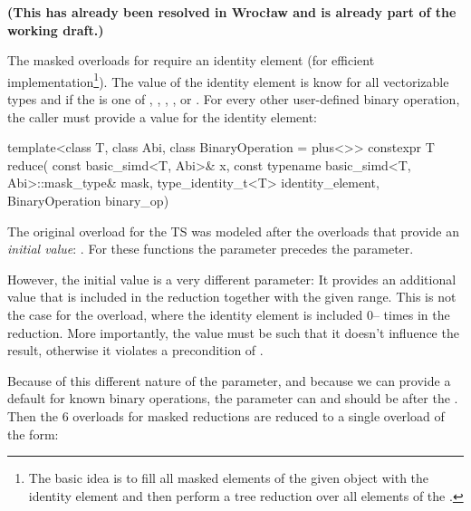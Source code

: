 \textbf{(This has already been resolved in Wrocław and is already part of the working draft.)}

The masked \std{} overloads for  require an identity element (for efficient
implementation\footnote{The basic idea is to fill all masked elements of the given 
object with the identity element and then perform a tree reduction over all elements of the
.}).
The value of the identity element is know for all vectorizable types and if the
 is one of \std{}, \std{}, \std{},
\std{}, or \std{}.
For every other user-defined binary operation, the caller must provide a value for the identity
element:

\begin{wgText}[P1928R11]
  \setcounter{Paras}{0}
  \begin{codeblock}
  template<class T, class Abi, class BinaryOperation = plus<>>
    constexpr T reduce(
      const basic_simd<T, Abi>& x, const typename basic_simd<T, Abi>::mask_type& mask,
      type_identity_t<T> identity_element, BinaryOperation binary_op)
  \end{codeblock}
\end{wgText}

The original  overload for the TS was modeled after the overloads that provide an
\emph{initial value}: .
For these functions the  parameter precedes the  parameter.

However, the initial value is a very different parameter: It provides an additional value that is
included in the reduction together with the given range.
This is not the case for the  overload, where the identity element is included
0-- times in the reduction.
More importantly, the value must be such that it doesn't influence the result, otherwise it violates
a precondition of .

Because of this different nature of the parameter, and because we can provide a default for known
binary operations, the  parameter can and should be after the
.
Then the 6 overloads for masked reductions are reduced to a single overload of the form:

